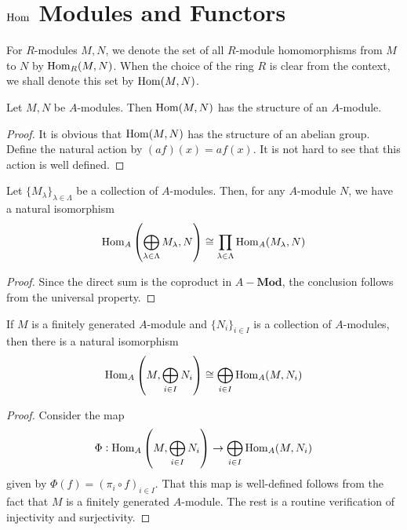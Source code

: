 \section{\texorpdfstring{$\operatorname{Hom}$}{} Modules and Functors}

For $R$-modules $M,N$, we denote the set of all $R$-module homomorphisms from $M$ to $N$ by $\operatorname{Hom}_R(M,N)$. When the choice of the ring $R$ is clear from the context, we shall denote this set by $\operatorname{Hom}(M,N)$.

\begin{proposition}
    Let $M,N$ be $A$-modules. Then $\operatorname{Hom}(M,N)$ has the structure of an $A$-module.
\end{proposition}
\begin{proof}
    It is obvious that $\operatorname{Hom}(M,N)$ has the structure of an abelian group. Define the natural action by $(af)(x) = af(x)$. It is not hard to see that this action is well defined.
\end{proof}

\begin{proposition}
    Let $\{M_\lambda\}_{\lambda\in\Lambda}$ be a collection of $A$-modules. Then, for any $A$-module $N$, we have a natural isomorphism
    \begin{equation*}
        \operatorname{Hom}_A\left(\bigoplus_{\lambda\in\Lambda}M_\lambda, N\right)\cong\prod_{\lambda\in\Lambda}\operatorname{Hom}_A(M_\lambda,N)
    \end{equation*}
\end{proposition}
\begin{proof}
    Since the direct sum is the coproduct in $A-\mathbf{Mod}$, the conclusion follows from the universal property.
\end{proof}

\begin{proposition}
    If $M$ is a finitely generated $A$-module and $\{N_i\}_{i\in I}$ is a collection of $A$-modules, then there is a natural isomorphism
    \begin{equation*}
        \operatorname{Hom}_A\left(M, \bigoplus_{i\in I}N_i\right)\cong\bigoplus_{i\in I}\operatorname{Hom}_A(M, N_i)
    \end{equation*}
\end{proposition}
\begin{proof}
    Consider the map 
    \begin{equation*}
        \Phi:\operatorname{Hom}_A\left(M, \bigoplus_{i\in I}N_i\right)\to\bigoplus_{i\in I}\operatorname{Hom}_A(M, N_i)
    \end{equation*}
    given by $\Phi(f) = (\pi_i\circ f)_{i\in I}$. That this map is well-defined follows from the fact that $M$ is a finitely generated $A$-module. The rest is a routine verification of injectivity and surjectivity.
\end{proof}

